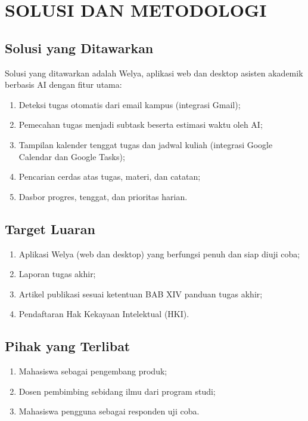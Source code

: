 \chapter{SOLUSI DAN METODOLOGI}

\section{Solusi yang Ditawarkan}
Solusi yang ditawarkan adalah Welya, aplikasi web dan desktop asisten
akademik berbasis
AI dengan fitur utama:
\begin{enumerate}
  \item Deteksi tugas otomatis dari email kampus (integrasi Gmail);
  \item Pemecahan tugas menjadi subtask beserta estimasi waktu oleh AI;
  \item Tampilan kalender tenggat tugas dan jadwal kuliah (integrasi
    Google Calendar dan Google Tasks);
  \item Pencarian cerdas atas tugas, materi, dan catatan;
  \item Dasbor progres, tenggat, dan prioritas harian.
\end{enumerate}

\section{Target Luaran}
\begin{enumerate}
  \item Aplikasi Welya (web dan desktop) yang berfungsi penuh dan siap
    diuji coba;
  \item Laporan tugas akhir;
  \item Artikel publikasi sesuai ketentuan BAB XIV panduan tugas akhir;
  \item Pendaftaran Hak Kekayaan Intelektual (HKI).
\end{enumerate}

\section{Pihak yang Terlibat}
\begin{enumerate}
  \item Mahasiswa sebagai pengembang produk;
  \item Dosen pembimbing sebidang ilmu dari program studi;
  \item Mahasiswa pengguna sebagai responden uji coba.
\end{enumerate}

